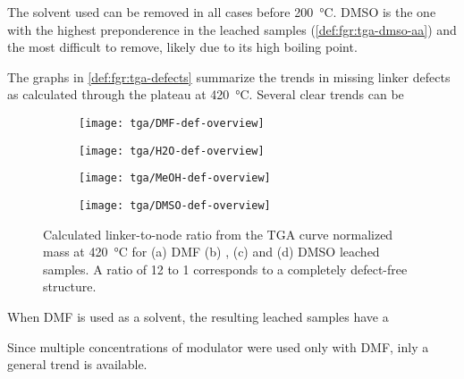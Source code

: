 The solvent used can be removed in all cases before 
\SI{200}{\degreeCelsius}. DMSO is the one with the highest
preponderence in the leached samples (\autoref{def:fgr:tga-dmso-aa}) 
and the most difficult to remove, likely due to its high boiling point.

The graphs in \autoref{def:fgr:tga-defects} summarize the 
trends in missing linker defects as calculated through 
the plateau at \SI{420}{\degreeCelsius}. Several clear trends can be 


\begin{figure}[htb]
    \centering

    \begin{subfigure}{0.45\linewidth}
        \texttt{[image: tga/DMF-def-overview]}%
        \label{def:fgr:tga-dmf-linkers}
    \end{subfigure}
    \begin{subfigure}{0.45\linewidth}
        \texttt{[image: tga/H2O-def-overview]}%
        \label{def:fgr:tga-h2o-linkers}
    \end{subfigure}

    
    \begin{subfigure}{0.45\linewidth}
        \texttt{[image: tga/MeOH-def-overview]}%
        \label{def:fgr:tga-meoh-linkers}
    \end{subfigure}
    \begin{subfigure}{0.45\linewidth}
        \texttt{[image: tga/DMSO-def-overview]}%
        \label{def:fgr:tga-dmso-linkers}
    \end{subfigure}

    \caption{Calculated linker-to-node ratio from the TGA curve 
    normalized mass at \SI{420}{\degreeCelsius} for (a) DMF 
    (b) , (c)  and (d) DMSO leached samples.
    A ratio of 12 to 1 corresponds to a completely defect-free
    structure.}%
    \label{def:fgr:tga-defects}
    
\end{figure}


When DMF is used as a solvent, the resulting leached samples 
have a 

Since multiple concentrations of modulator were used only with 
DMF, inly a general trend is available.